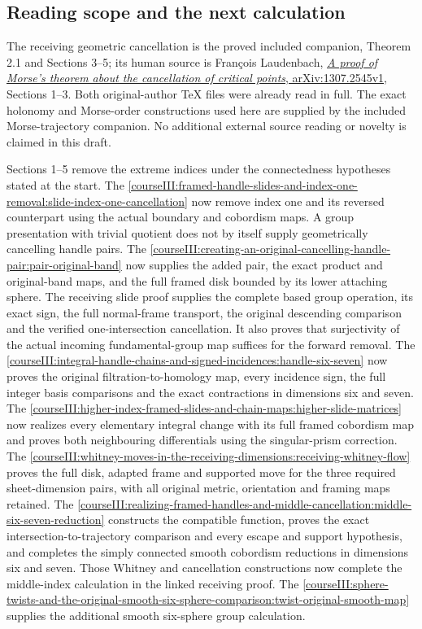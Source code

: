 \subsection{Reading scope and the next calculation}
\label{courseIII:removing-the-original-zero-and-top-handles:zero-sources}

\label{courseIII:removing-the-original-zero-and-top-handles:section-7}

The receiving geometric cancellation is the proved included companion, Theorem 2.1 and Sections 3--5; its human source is François Laudenbach, \href{https://arxiv.org/abs/1307.2545v1}{\emph{A proof of Morse's theorem about the cancellation of critical points}, arXiv:1307.2545v1}, Sections 1--3. Both original-author TeX files were already read in full. The exact holonomy and Morse-order constructions used here are supplied by the included Morse-trajectory companion. No additional external source reading or novelty is claimed in this draft.

Sections 1--5 remove the extreme indices under the connectedness hypotheses stated at the start. The \cref{courseIII:framed-handle-slides-and-index-one-removal:slide-index-one-cancellation} now remove index one and its reversed counterpart using the actual boundary and cobordism maps. A group presentation with trivial quotient does not by itself supply geometrically cancelling handle pairs. The \cref{courseIII:creating-an-original-cancelling-handle-pair:pair-original-band} now supplies the added pair, the exact product and original-band maps, and the full framed disk bounded by its lower attaching sphere. The receiving slide proof supplies the complete based group operation, its exact sign, the full normal-frame transport, the original descending comparison and the verified one-intersection cancellation. It also proves that surjectivity of the actual incoming fundamental-group map suffices for the forward removal. The \cref{courseIII:integral-handle-chains-and-signed-incidences:handle-six-seven} now proves the original filtration-to-homology map, every incidence sign, the full integer basis comparisons and the exact contractions in dimensions six and seven. The \cref{courseIII:higher-index-framed-slides-and-chain-maps:higher-slide-matrices} now realizes every elementary integral change with its full framed cobordism map and proves both neighbouring differentials using the singular-prism correction. The \cref{courseIII:whitney-moves-in-the-receiving-dimensions:receiving-whitney-flow} proves the full disk, adapted frame and supported move for the three required sheet-dimension pairs, with all original metric, orientation and framing maps retained. The \cref{courseIII:realizing-framed-handles-and-middle-cancellation:middle-six-seven-reduction} constructs the compatible function, proves the exact intersection-to-trajectory comparison and every escape and support hypothesis, and completes the simply connected smooth cobordism reductions in dimensions six and seven. Those Whitney and cancellation constructions now complete the middle-index calculation in the linked receiving proof. The \cref{courseIII:sphere-twists-and-the-original-smooth-six-sphere-comparison:twist-original-smooth-map} supplies the additional smooth six-sphere group calculation.
